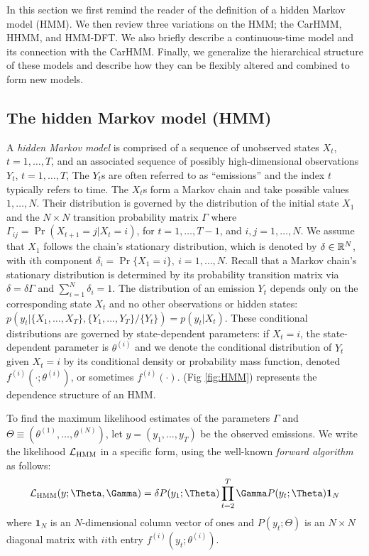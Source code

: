 
In this section we first remind the reader of the definition of a hidden Markov model (HMM). We then review three variations on the HMM; the CarHMM, HHMM, and HMM-DFT. We also briefly describe a continuous-time model and its connection with the CarHMM. Finally, we generalize the hierarchical structure of these models and describe how they can be flexibly altered and combined to form new models.

\subsection{The hidden Markov model (HMM)}

A \textit{hidden Markov model}  is comprised of a sequence of  unobserved states $X_t$, $t = 1, \ldots, T$, and an associated sequence of  possibly high-dimensional observations $Y_t$, $t = 1, \ldots, T$,
The $Y_t$s are often referred to as ``emissions'' and the index $t$ typically refers to time. 
The $X_t$s form a Markov chain and take possible values $1, \ldots, N$. Their distribution is governed by the distribution of the initial state $X_1$ and the $N \times N$ transition probability matrix $\Gamma$ where $\Gamma_{ij} = \Pr(X_{t+1} = j | X_t = i)$, for $t=1,\ldots, T-1$, and $i, j = 1,\ldots, N$. 
%
We assume that $X_1$ follows the chain's stationary distribution, which is denoted by $\delta \in \mathbb{R}^N$, with $i$th component
$\delta_i = \Pr\{X_1 = i\},~ i = 1,\ldots,N.$
%
Recall that a Markov chain's stationary distribution is determined by its probability transition matrix via $\delta = \delta \Gamma$ and $\sum_{i=1}^N \delta_i = 1$.
%
The distribution of an emission $Y_t$ depends only on the corresponding state $X_t$ and no other observations or hidden states: $p\left(y_t|\{X_1,\ldots, X_T\},\{Y_1,\ldots, Y_T\}/ \{Y_t\}\right) = p(y_t|X_t)$.
%
These conditional distributions are governed by state-dependent parameters: if $X_t = i$, the state-dependent parameter is $\theta^{(i)}$ and we denote the conditional distribution of $Y_t$ given $X_t=i$ by its conditional density or probability mass function, denoted $f^{(i)}(\cdot ; \theta^{(i)})$, or sometimes  $f^{(i)}(\cdot)$.
%
(Fig \ref{fig:HMM}) represents the dependence structure of an HMM.

To find the maximum likelihood estimates of the parameters $\Gamma$ and $\Theta \equiv (\theta^{(1)},\ldots,\theta^{(N)})$, let $y = (y_1,\ldots,y_T)$ be the observed emissions. 
We write the likelihood $\mathcal{L}_{\text{HMM}}$ in a specific form, using the  well-known \textit{forward algorithm} \citep{Zucchini:2016} as follows:
%
$$\calL_{\text{HMM}}(y;\Theta,\Gamma) = \delta P(y_1;\Theta) \prod_{t=2}^T \Gamma P(y_t;\Theta) \mathbf{1}_N$$
%
where $\mathbf{1}_N$ is an $N$-dimensional column vector of ones and
%
$P(y_t;\Theta)$ is an $N \times N$ diagonal matrix with $ii$th entry  $f^{(i)}(y_t; \theta^{(i)})$.
%

